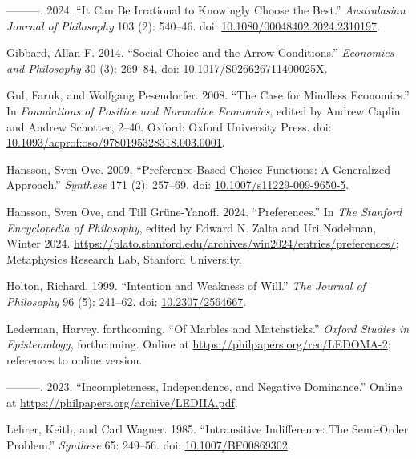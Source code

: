 \documentclass[
  11pt,
  letterpaper,
  DIV=11,
  numbers=noendperiod,
  twoside]{scrartcl}
\newlength{\cslhangindent}
\newenvironment{CSLReferences}[2] %
 {\begin{list}{}{%
  \setlength{\itemindent}{0pt}
  \setlength{\leftmargin}{0pt}
  \setlength{\parsep}{0pt}
  \ifodd #1
   \setlength{\leftmargin}{\cslhangindent}
   \setlength{\itemindent}{-1\cslhangindent}
  \fi
  \setlength{\itemsep}{#2\baselineskip}}}
 {\end{list}}
\begin{document}
\begin{CSLReferences}{1}{0}
---------. 2024. {``It Can Be Irrational to Knowingly Choose the
Best.''} \emph{Australasian Journal of Philosophy} 103 (2): 540--46.
doi:
\href{https://doi.org/10.1080/00048402.2024.2310197}{10.1080/00048402.2024.2310197}.

Gibbard, Allan F. 2014. {``Social Choice and the Arrow Conditions.''}
\emph{Economics and Philosophy} 30 (3): 269--84. doi:
\href{https://doi.org/10.1017/S026626711400025X}{10.1017/S026626711400025X}.

Gul, Faruk, and Wolfgang Pesendorfer. 2008. {``The Case for Mindless
Economics.''} In \emph{Foundations of Positive and Normative Economics},
edited by Andrew Caplin and Andrew Schotter, 2--40. Oxford: Oxford
University Press. doi:
\href{https://doi.org/10.1093/acprof:oso/9780195328318.003.0001}{10.1093/acprof:oso/9780195328318.003.0001}.

Hansson, Sven Ove. 2009. {``Preference-Based Choice Functions: A
Generalized Approach.''} \emph{Synthese} 171 (2): 257--69. doi:
\href{https://doi.org/10.1007/s11229-009-9650-5}{10.1007/s11229-009-9650-5}.

Hansson, Sven Ove, and Till Grüne-Yanoff. 2024. {``{Preferences}.''} In
\emph{The {Stanford} Encyclopedia of Philosophy}, edited by Edward N.
Zalta and Uri Nodelman, {W}inter 2024.
\url{https://plato.stanford.edu/archives/win2024/entries/preferences/};
Metaphysics Research Lab, Stanford University.

Holton, Richard. 1999. {``Intention and Weakness of Will.''} \emph{The
Journal of Philosophy} 96 (5): 241--62. doi:
\href{https://doi.org/10.2307/2564667}{10.2307/2564667}.

Lederman, Harvey. forthcoming. {``Of Marbles and Matchsticks.''}
\emph{Oxford Studies in Epistemology}, forthcoming. Online at
\url{https://philpapers.org/rec/LEDOMA-2}; references to online version.

---------. 2023. {``Incompleteness, Independence, and Negative
Dominance.''} Online at \url{https://philpapers.org/archive/LEDIIA.pdf}.

Lehrer, Keith, and Carl Wagner. 1985. {``Intransitive Indifference: The
Semi-Order Problem.''} \emph{Synthese} 65: 249--56. doi:
\href{https://doi.org/10.1007/BF00869302}{10.1007/BF00869302}.


\end{CSLReferences}
\end{document}
